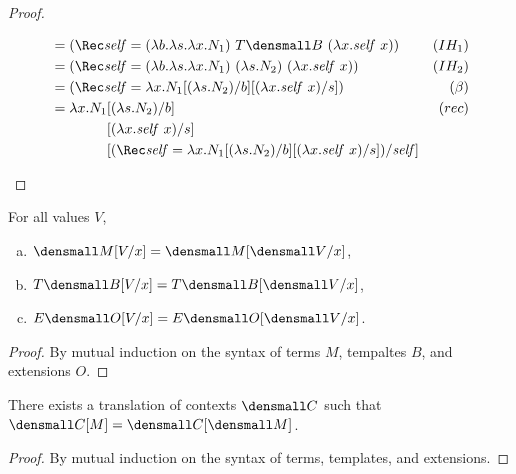 \begin{proof}
\begin{enumerate}[(a)]
\begin{itemize}
\begin{align*}
        &=
        (\Rec \mathit{self}
        = (\lambda b. \lambda s. \lambda x. N_1)
        ~ T\den{B}
        ~ (\lambda x. \mathit{self} ~ x))
        &(IH_1)
        \\
        &=
        (\Rec \mathit{self}
        = (\lambda b. \lambda s. \lambda x. N_1)
        ~ (\lambda s. N_2)
        ~ (\lambda x. \mathit{self} ~ x))
        &(IH_2)
        \\
        &=
        (\Rec \mathit{self}
        = \lambda x.N_1\subst{b}{(\lambda s.N_2)}\subst{s}{(\lambda x.\mathit{self}~x)})
        &(\beta)
        \\
        &=
        \begin{aligned}[t]
          \lambda x.
          N_1
          &\subst{b}{(\lambda s.N_2)}
          \\
          &\subst{s}{(\lambda x.\mathit{self}~x)}
          \\
          &\subst
          {\mathit{self}}
          {
            (\Rec \mathit{self}
            =
            \lambda x.N_1\subst{b}{(\lambda s.N_2)}\subst{s}{(\lambda x.\mathit{self}~x)})
          }
        \end{aligned}
        &(rec)
      \end{align*}
    \end{itemize}
  \end{enumerate}
\end{proof}

\begin{lemma}[Substitution]
  \label{thm:substitution-translation}
  For all values $V$,
  \begin{enumerate}[(a)]
  \item $\den{M\subst{x}{V}} = \den{M}\subst{x}{\den{V}}$,
  \item $T\den{B\subst{x}{V}} = T\den{B}\subst{x}{\den{V}}$,
  \item $E\den{O\subst{x}{V}} = E\den{O}\subst{x}{\den{V}}$.
  \end{enumerate}
\end{lemma}
\begin{proof}
  By mutual induction on the syntax of terms $M$, tempaltes $B$, and extensions $O$.
\end{proof}

\begin{lemma}[Compositionality]
  \label{thm:compositional-translation}

  There exists a translation of contexts $\den{C}$ such that
  $\den{C[M]} = \den{C}{[\den{M}]}$.
\end{lemma}
\begin{proof}
  By mutual induction on the syntax of terms, templates, and extensions.
\end{proof}

